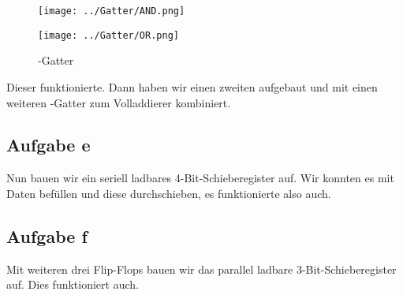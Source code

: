 \begin{figure}[htbp]
	\centering
	\begin{minipage}{.45\linewidth}
		\texttt{[image: ../Gatter/AND.png]}
		\caption{%
			\tand-Gatter.
			\cite[Seite~20]{wirsum/experimente_schaltglieder}
		}
		\label{fig:and}
	\end{minipage}
	\hfill
	\begin{minipage}{.45\linewidth}
		\texttt{[image: ../Gatter/OR.png]}
		\caption{%
			\tor-Gatter
			\cite[Seite~21]{wirsum/experimente_schaltglieder}
		}
		\label{fig:or}
	\end{minipage}
\end{figure}

Dieser funktionierte. Dann haben wir einen zweiten aufgebaut und mit einen
weiteren \tor-Gatter zum Volladdierer kombiniert.

\FloatBarrier
\subsection{Aufgabe e}

Nun bauen wir ein seriell ladbares 4-Bit-Schieberegister auf. Wir konnten es
mit Daten befüllen und diese durchschieben, es funktionierte also auch.

\FloatBarrier
\subsection{Aufgabe f}

Mit weiteren drei Flip-Flops bauen wir das parallel ladbare
3-Bit-Schieberegister auf. Dies funktioniert auch.


\FloatBarrier
\IfFileExists{\bibliographyfile}{
	
}{}



